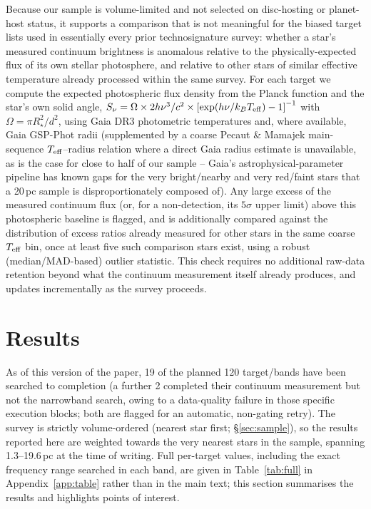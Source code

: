 \documentclass{openjournal}
\begin{document}
Because our sample is volume-limited and not selected on disc-hosting or
planet-host status, it supports a comparison that is not meaningful for
the biased target lists used in essentially every prior technosignature
survey: whether a star's measured continuum brightness is anomalous
relative to the physically-expected flux of its own stellar photosphere,
and relative to other stars of similar effective temperature already
processed within the same survey. For each target we compute the
expected photospheric flux density from the Planck function and the
star's own solid angle,
$S_\nu = \Omega \times 2h\nu^3/c^2 \times \left[\exp(h\nu/k_BT_{\rm eff}) - 1\right]^{-1}$
with $\Omega = \pi R_\star^2/d^2$, using Gaia DR3 photometric
temperatures and, where available, Gaia GSP-Phot radii (supplemented by a
coarse Pecaut \& Mamajek main-sequence $T_{\rm eff}$--radius relation
where a direct Gaia radius estimate is unavailable, as is the case for
close to half of our sample -- Gaia's astrophysical-parameter pipeline
has known gaps for the very bright/nearby and very red/faint stars that
a 20\,pc sample is disproportionately composed of). Any large excess of
the measured continuum flux (or, for a non-detection, its $5\sigma$ upper
limit) above this photospheric baseline is flagged, and is additionally
compared against the distribution of excess ratios already measured for
other stars in the same coarse $T_{\rm eff}$ bin, once at least five such
comparison stars exist, using a robust (median/MAD-based) outlier
statistic. This check requires no additional raw-data retention beyond
what the continuum measurement itself already produces, and updates
incrementally as the survey proceeds.

\section{Results}
\label{sec:results}

As of this version of the paper, 19 of the planned 120 target/bands have
been searched to completion (a further 2 completed their continuum
measurement but not the narrowband search, owing to a data-quality
failure in those specific execution blocks; both are flagged for an
automatic, non-gating retry). The survey is strictly volume-ordered
(nearest star first; \S\ref{sec:sample}), so the results reported here
are weighted towards the very nearest stars in the sample, spanning
1.3--19.6\,pc at the time of writing. Full per-target values, including
the exact frequency range searched in each band, are given in
Table~\ref{tab:full} in Appendix~\ref{app:table} rather than in the main
text; this section summarises the results and highlights points of
interest.
\end{document}
